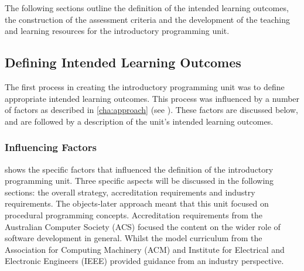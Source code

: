 The following sections outline the definition of the intended learning outcomes, the construction of the assessment criteria and the development of the teaching and learning resources for the introductory programming unit.


\subsection{Defining Intended Learning Outcomes} %
\label{sec:intro:intended_learning_outcomes}

The first process in creating the introductory programming unit was to define appropriate intended learning outcomes. This process was influenced by a number of factors as described in \cref{cha:approach} (see ). These factors are discussed below, and are followed by a description of the unit's intended learning outcomes.

\subsubsection{Influencing Factors} %
\label{ssub:influencing_factors}

 shows the specific factors that influenced the definition of the introductory programming unit. Three specific aspects will be discussed in the following sections: the overall strategy, accreditation requirements and industry requirements. The objects-later approach meant that this unit focused on procedural programming concepts. Accreditation requirements from the Australian Computer Society (ACS) focused the content on the wider role of software development in general. Whilst the model curriculum from the Association for Computing Machinery (ACM) and Institute for Electrical and Electronic Engineers (IEEE) provided guidance from an industry perspective.

